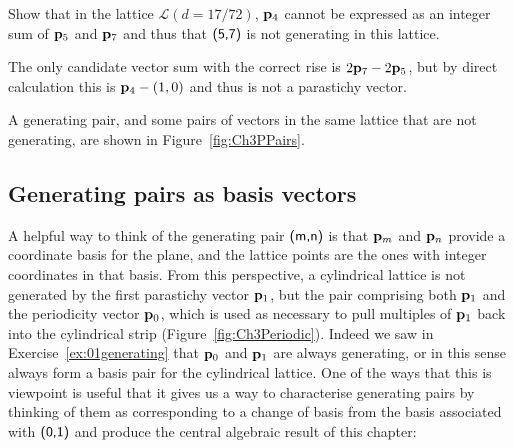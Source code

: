 \begin{jExercise}
	Show that in the lattice $\mathcal{L}(d=17/72)$, ${\mathbf p}_{4}$ cannot be expressed as an integer sum of ${\mathbf p}_{5}$ and ${\mathbf p}_{7}$ and thus that $\textsf{(5,7)}$ is not generating in this lattice.
\end{jExercise}
\begin{jAnswer}
	The only candidate vector sum with the correct rise is $2{\mathbf p}_{7}-2{\mathbf p}_{5}$, but by direct calculation this is ${\mathbf p}_{4}-(1,0)$ and thus is not a parastichy vector. 
\end{jAnswer}

A generating pair, and some pairs of vectors in the same lattice that are not generating, are shown in Figure~\ref{fig:Ch3PPairs}.

\subsection{Generating pairs as basis vectors}
 A helpful way to think of the generating pair $\textsf{(m,n)}$ is that  ${\mathbf p}_{m}$ and ${\mathbf p}_{n}$ provide a coordinate basis for the plane, and the lattice points are the ones with integer coordinates in that basis. From this perspective, a cylindrical lattice is not generated by the first parastichy vector ${\mathbf p}_{1}$, but the pair comprising both ${\mathbf p}_{1}$ and the periodicity vector ${\mathbf p}_{0}$, which is used as necessary to pull multiples of ${\mathbf p}_{1}$ back into the cylindrical strip (Figure~\ref{fig:Ch3Periodic}).
 Indeed we saw in Exercise~\ref{ex:01generating} that ${\mathbf p}_{0}$ and ${\mathbf p}_{1}$ are always generating, or in this sense always form a basis pair for the cylindrical lattice. 
 One of the ways that this is viewpoint is useful  that it gives us a way to characterise generating pairs by thinking of them as corresponding to a change of basis from the basis associated with $\textsf{(0,1)}$ and produce the central algebraic result of this chapter:

